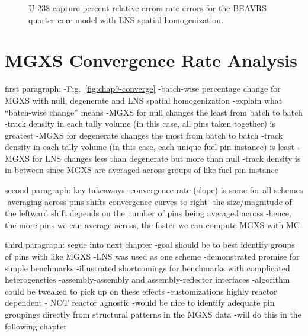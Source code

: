 \begin{figure}[h!]
\begin{subfigure}{.5\textwidth}
  \caption{}
  \label{fig:chap9-full-core-lns-magnitude}
\end{subfigure}
\caption[U-238 capture rate errors for the \ac{BEAVRS} quarter core model]{U-238 capture percent relative errors rate errors for the \ac{BEAVRS} quarter core model with \ac{LNS} spatial homogenization.}\label{fig:chap9-full-core-lns-capt-err}
\end{figure}

\clearpage


\section{MGXS Convergence Rate Analysis}
\label{sec:chap9-convergence}

first paragraph: 
-Fig.~\ref{fig:chap9-converge}
  -batch-wise percentage change for \ac{MGXS} with null, degenerate and \ac{LNS} spatial homogenization
  -explain what ``batch-wise change'' means
-\ac{MGXS} for null changes the least from batch to batch
  -track density in each tally volume (in this case, all pins taken together) is greatest
-\ac{MGXS} for degenerate changes the most from batch to batch
  -track density in each tally volume (in this case, each unique fuel pin instance) is least
-\ac{MGXS} for \ac{LNS} changes less than degenerate but more than null
  -track density is in between since \ac{MGXS} are averaged across groups of like fuel pin instance

second paragraph: key takeaways
-convergence rate (slope) is same for all schemes
-averaging across pins shifts convergence curves to right
-the size/magnitude of the leftward shift depends on the number of pins being averaged across
-hence, the more pins we can average across, the faster we can compute \ac{MGXS} with \ac{MC}

third paragraph: segue into next chapter
-goal should be to best identify groups of pins with like \ac{MGXS}
-\ac{LNS} was used as one scheme
  -demonstrated promise for simple benchmarks
  -illustrated shortcomings for benchmarks with complicated heterogeneties
    -assembly-assembly and assembly-reflector interfaces
  -algorithm could be tweaked to pick up on these effects
    -customizations highly reactor dependent - NOT reactor agnostic
-would be nice to identify adequate pin groupings directly from structural patterns in the \ac{MGXS} data
-will do this in the following chapter

